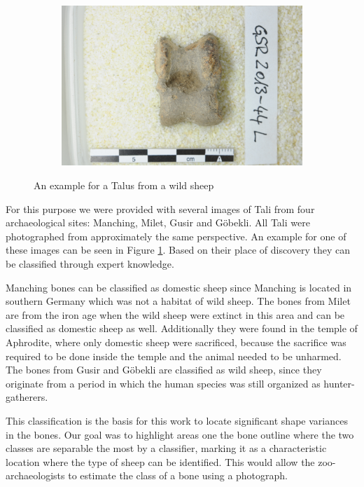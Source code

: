 \documentclass[pdftex,12pt,a4paper]{report}
\begin{document}
\begin{figure}[h]
	\centering
	\begin{subfigure}[b]{0.65\textwidth}
		\centering
		\includegraphics[width=.9\linewidth]{img/example.jpg}
	\end{subfigure}
	\caption{An example for a Talus from a wild sheep}
	\label{fig:problem-example}
\end{figure}


For this purpose we were provided with several images of Tali from four archaeological sites: Manching, Milet, Gusir and Göbekli. All Tali were photographed from approximately the same perspective. An example for one of these images can be seen in Figure \ref{fig:problem-example}. Based on their place of discovery they can be classified through expert knowledge.

Manching bones can be classified as domestic sheep since Manching is located in southern Germany which was not a habitat of wild sheep. The bones from Milet are from the iron age when the wild sheep were extinct in this area and can be classified as domestic sheep as well. Additionally they were found in the temple of Aphrodite, where only domestic sheep were sacrificed, because the sacrifice was required to be done inside the temple and the animal needed to be unharmed. The bones from Gusir and Göbekli are classified as wild sheep, since they originate from a period in which the human species was still organized as hunter-gatherers.

This classification is the basis for this work to locate significant shape variances in the bones. Our goal was to highlight areas one the bone outline where the two classes are separable the most by a classifier, marking it as a characteristic location where the type of sheep can be identified. This would allow the zoo-archaeologists to estimate the class of a bone using a photograph.
\end{document}
